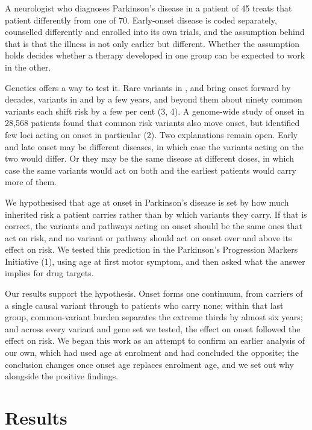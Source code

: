 \documentclass[10pt]{article}
\begin{document}
A neurologist who diagnoses Parkinson's disease in a patient of 45 treats that
patient differently from one of 70. Early-onset disease is coded separately,
counselled differently and enrolled into its own trials, and the assumption
behind that is that the illness is not only earlier but different. Whether the
assumption holds decides whether a therapy developed in one group can be
expected to work in the other.

Genetics offers a way to test it. Rare variants in ,  and
 bring onset forward by decades, variants in  and
 by a few years, and beyond them about ninety common variants each
shift risk by a few per cent (3, 4). A genome-wide study of onset in 28,568
patients found that common risk variants also move onset, but identified few
loci acting on onset in particular (2). Two explanations remain open. Early and
late onset may be different diseases, in which case the variants acting on the
two would differ. Or they may be the same disease at different doses, in which
case the same variants would act on both and the earliest patients would carry
more of them.

We hypothesised that age at onset in Parkinson's disease is set by how much
inherited risk a patient carries rather than by which variants they carry. If
that is correct, the variants and pathways acting on onset should be the same
ones that act on risk, and no variant or pathway should act on onset over and
above its effect on risk. We tested this prediction in the Parkinson's
Progression Markers Initiative (1), using age at first motor symptom, and then
asked what the answer implies for drug targets.

Our results support the hypothesis. Onset forms one continuum, from carriers of a single causal variant through to patients who carry none; within that last group, common-variant burden separates the extreme thirds by almost six years; and across every variant and gene set we tested, the effect on onset followed the effect on risk. We began this work as an attempt to confirm an earlier analysis of our own,
which had used age at enrolment and had concluded the opposite; the conclusion changes once onset age replaces enrolment age, and we set out why alongside the positive findings.

\section*{Results}
\end{document}
